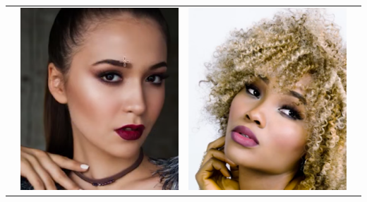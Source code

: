 \begin{longtable}{|N||c|c|c|}
\begin{minipage}{.29\textwidth}
  \end{minipage} & 
  \begin{minipage}{.29\textwidth}
    \includegraphics[width=\textwidth,height=\textheight,keepaspectratio]{images/match_other_2_targ}
  \end{minipage} & 
  \begin{minipage}{.29\textwidth}
    \includegraphics[width=\textwidth,height=\textheight,keepaspectratio]{images/match_other_2_res}

\end{minipage}
\end{longtable}
